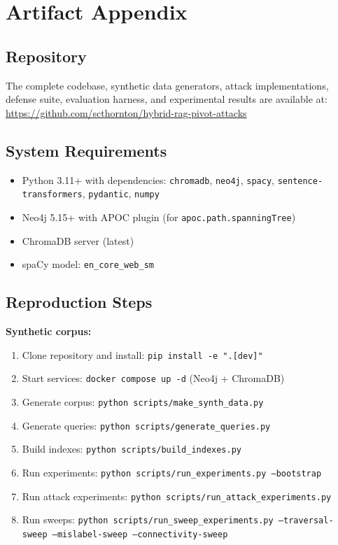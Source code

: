 \documentclass[letterpaper,twocolumn,10pt]{article}
\begin{document}
\section{Artifact Appendix}
\label{sec:artifact}

\subsection{Repository}

The complete codebase, synthetic data generators, attack
implementations, defense suite, evaluation harness, and experimental
results are available at:
\url{https://github.com/scthornton/hybrid-rag-pivot-attacks}

\subsection{System Requirements}

\begin{itemize}
\item Python 3.11+ with dependencies: \texttt{chromadb},
  \texttt{neo4j}, \texttt{spacy}, \texttt{sentence-transformers},
  \texttt{pydantic}, \texttt{numpy}
\item Neo4j 5.15+ with APOC plugin (for
  \texttt{apoc.path.spanningTree})
\item ChromaDB server (latest)
\item spaCy model: \texttt{en\_core\_web\_sm}
\end{itemize}

\subsection{Reproduction Steps}

\textbf{Synthetic corpus:}
\begin{enumerate}
\item Clone repository and install: \texttt{pip install -e ".[dev]"}
\item Start services: \texttt{docker compose up -d} (Neo4j + ChromaDB)
\item Generate corpus: \texttt{python scripts/make\_synth\_data.py}
\item Generate queries: \texttt{python scripts/generate\_queries.py}
\item Build indexes: \texttt{python scripts/build\_indexes.py}
\item Run experiments: \texttt{python scripts/run\_experiments.py
  --bootstrap}
\item Run attack experiments: \texttt{python
  scripts/run\_attack\_experiments.py}
\item Run sweeps: \texttt{python scripts/run\_sweep\_experiments.py
  --traversal-sweep --mislabel-sweep --connectivity-sweep}
\end{enumerate}
\end{document}
